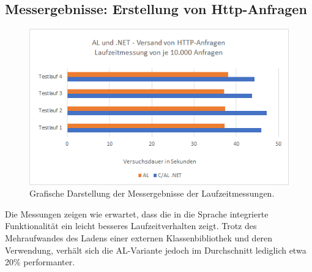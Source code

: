 \subsection{Messergebnisse: Erstellung von Http-Anfragen}
\begin{table}[H]
	\label{tab:Test1Measurements}
	\caption{Ergebnisse für 10000 Anfragen, Messwerte in Sekunden.}
	\centering
\end{table}

\begin{figure}[h]
	\centering
	\includegraphics[width=140mm]{images/Tests-WS}
	\caption{Grafische Darstellung der Messergebnisse der Laufzeitmessungen.}
	\label{fig:Test1Graphical}
\end{figure}

Die Messungen zeigen wie erwartet, dass die in die Sprache integrierte Funktionalität ein leicht besseres Laufzeitverhalten zeigt. Trotz des Mehraufwandes des Ladens einer externen Klassenbibliothek und deren Verwendung, verhält sich die AL-Variante jedoch im Durchschnitt lediglich etwa 20\% performanter.
\pagebreak


